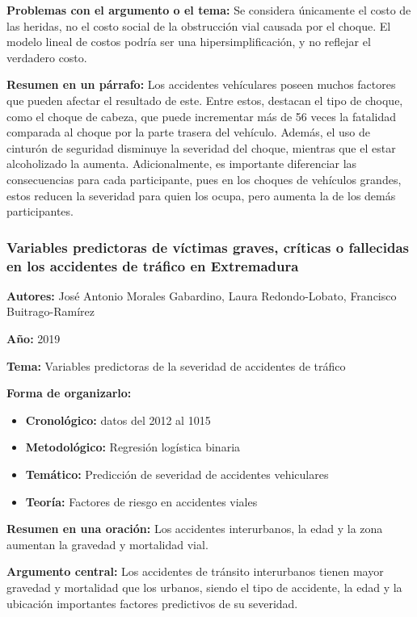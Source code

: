 \documentclass{book}
\begin{document}
\textbf{Problemas con el argumento o el tema:} Se considera únicamente el costo de las heridas, no el costo social de la obstrucción vial causada por el choque. El modelo lineal de costos podría ser una hipersimplificación, y no reflejar el verdadero costo.

\textbf{Resumen en un párrafo:} Los accidentes vehículares poseen muchos factores que pueden afectar el resultado de este. Entre estos, destacan el tipo de choque, como el choque de cabeza, que puede incrementar más de 56 veces la fatalidad comparada al choque por la parte trasera del vehículo. Además, el uso de cinturón de seguridad disminuye la severidad del choque, mientras que el estar alcoholizado la aumenta. Adicionalmente, es importante diferenciar las consecuencias para cada participante, pues en los choques de vehículos grandes, estos reducen la severidad para quien los ocupa, pero aumenta la de los demás participantes. 

\subsubsection{Variables predictoras de víctimas graves, críticas o fallecidas en los accidentes de tráfico en Extremadura}
\textbf{Autores:} José Antonio Morales Gabardino, Laura Redondo-Lobato, Francisco Buitrago-Ramírez

\textbf{Año:} 2019

\textbf{Tema:} Variables predictoras de la severidad de accidentes de tráfico

\textbf{Forma de organizarlo:}

\begin{itemize}
\setlength{\itemindent}{0.5in}
    \item \textbf{Cronológico:} datos del 2012 al 1015
    \item \textbf{Metodológico:} Regresión logística binaria
    \item \textbf{Temático:} Predicción de severidad de accidentes vehiculares
    \item \textbf{Teoría:} Factores de riesgo en accidentes viales
\end{itemize}

\textbf{Resumen en una oración:} Los accidentes interurbanos, la edad y la zona aumentan la gravedad y mortalidad vial.

\textbf{Argumento central:} Los accidentes de tránsito interurbanos tienen mayor gravedad y mortalidad que los urbanos, siendo el tipo de accidente, la edad y la ubicación importantes factores predictivos de su severidad.
\end{document}
